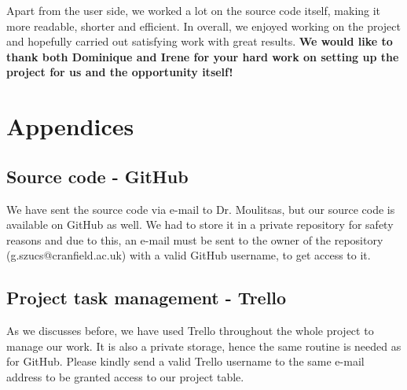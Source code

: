 \documentclass[a4paper, 11pt, article]{report}
\begin{document}
Apart from the user side, we worked a lot on the source code itself, making it more readable, shorter and efficient. In overall, we enjoyed working on the project and hopefully carried out satisfying work with great results. \textbf{We would like to thank both Dominique and Irene for your hard work on setting up the project for us and the opportunity itself!}


\chapter{Appendices}

\section{Source code - GitHub}

We have sent the source code via e-mail to Dr. Moulitsas, but our source code is available on GitHub as well. We had to store it in a private repository for safety reasons and due to this, an e-mail must be sent to the owner of the repository (g.szucs@cranfield.ac.uk) with a valid GitHub username, to get access to it. 

\section{Project task management - Trello}

As we discusses before, we have used Trello throughout the whole project to manage our work. It is also a private storage, hence the same routine is needed as for GitHub. Please kindly send a valid Trello username to the same e-mail address to be granted access to our project table. 

\end{document}
